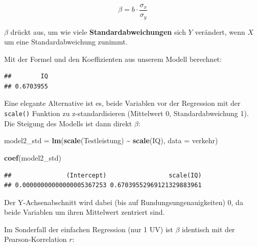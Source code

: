 \documentclass[
]{book}
\newenvironment{Shaded}{\begin{snugshade}}{\end{snugshade}}
\newcommand{\AttributeTok}[1]{\textcolor[rgb]{0.13,0.29,0.53}{#1}}
\newcommand{\FunctionTok}[1]{\textcolor[rgb]{0.13,0.29,0.53}{\textbf{#1}}}
\newcommand{\NormalTok}[1]{#1}
\newcommand{\OtherTok}[1]{\textcolor[rgb]{0.56,0.35,0.01}{#1}}
\newcommand{\SpecialCharTok}[1]{\textcolor[rgb]{0.81,0.36,0.00}{\textbf{#1}}}
\newcommand{\StringTok}[1]{\textcolor[rgb]{0.31,0.60,0.02}{#1}}
\begin{document}
\[\beta = b \cdot \frac{\sigma_x}{\sigma_y}\]

\(\beta\) drückt aus, um wie viele \textbf{Standardabweichungen} sich \(Y\) verändert, wenn \(X\) um eine Standardabweichung zunimmt.

Mit der Formel und den Koeffizienten aus unserem Modell berechnet:

\begin{Shaded}
\end{Shaded}

\begin{verbatim}
##        IQ 
## 0.6703955
\end{verbatim}

Eine elegante Alternative ist es, beide Variablen vor der Regression mit der \texttt{scale()} Funktion zu z-standardisieren (Mittelwert 0, Standardabweichung 1). Die Steigung des Modells ist dann direkt \(\beta\):

\begin{Shaded}
\begin{Highlighting}[]
\NormalTok{model2\_std }\OtherTok{=} \FunctionTok{lm}\NormalTok{(}\FunctionTok{scale}\NormalTok{(Testleistung) }\SpecialCharTok{\textasciitilde{}} \FunctionTok{scale}\NormalTok{(IQ), }\AttributeTok{data =}\NormalTok{ verkehr)}

\FunctionTok{coef}\NormalTok{(model2\_std)}
\end{Highlighting}
\end{Shaded}

\begin{verbatim}
##               (Intercept)                 scale(IQ) 
## 0.00000000000000005367253 0.67039552969121329883961
\end{verbatim}

Der Y-Achsenabschnitt wird dabei (bis auf Rundungsungenauigkeiten) 0, da beide Variablen um ihren Mittelwert zentriert sind.

Im Sonderfall der einfachen Regression (nur 1 UV) ist \(\beta\) identisch mit der Pearson-Korrelation \(r\):

\begin{Shaded}
\end{Shaded}
\end{document}
